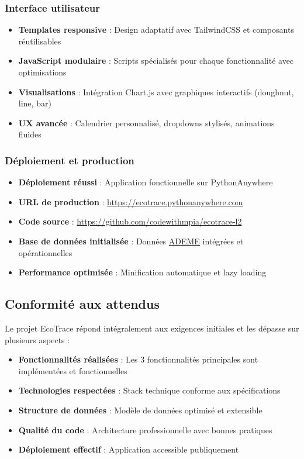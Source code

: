 \documentclass[a4paper,11pt]{article}
\begin{document}
    \subsubsection{Interface utilisateur}
    \begin{itemize}
        \item \textbf{Templates responsive} : Design adaptatif avec TailwindCSS et composants réutilisables
        \item \textbf{JavaScript modulaire} : Scripts spécialisés pour chaque fonctionnalité avec optimisations
        \item \textbf{Visualisations} : Intégration Chart.js avec graphiques interactifs (doughnut, line, bar)
        \item \textbf{UX avancée} : Calendrier personnalisé, dropdowns stylisés, animations fluides
    \end{itemize}

    \subsubsection{Déploiement et production}
    \begin{itemize}
        \item \textbf{Déploiement réussi} : Application fonctionnelle sur PythonAnywhere
        \item \textbf{URL de production} : \url{https://ecotrace.pythonanywhere.com}
        \item \textbf{Code source} : \url{https://github.com/codewithmpia/ecotrace-l2}
        \item \textbf{Base de données initialisée} : Données \href{https://www.ademe.fr}{ADEME} intégrées et opérationnelles
        \item \textbf{Performance optimisée} : Minification automatique et lazy loading
    \end{itemize}

    \subsection{Conformité aux attendus}

    Le projet EcoTrace répond intégralement aux exigences initiales et les dépasse sur plusieurs aspects :

    \begin{itemize}
        \item \textbf{Fonctionnalités réalisées} : Les 3 fonctionnalités principales sont implémentées et fonctionnelles
        \item \textbf{Technologies respectées} : Stack technique conforme aux spécifications
        \item \textbf{Structure de données} : Modèle de données optimisé et extensible
        \item \textbf{Qualité du code} : Architecture professionnelle avec bonnes pratiques
        \item \textbf{Déploiement effectif} : Application accessible publiquement
    \end{itemize}
\end{document}
